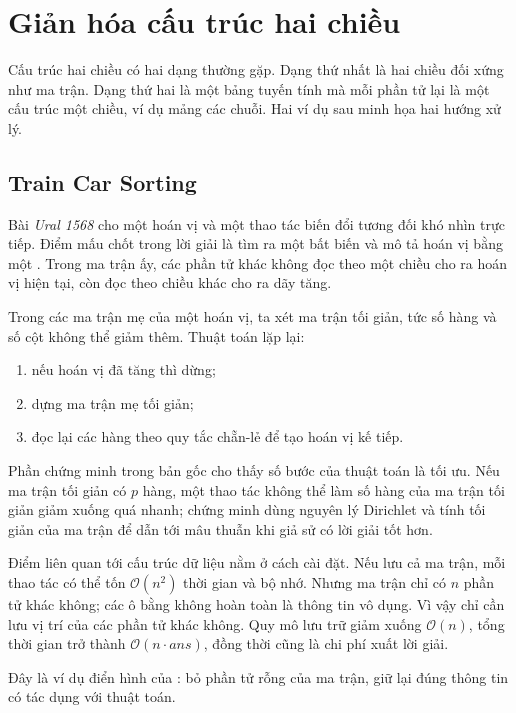 \documentclass[11pt]{article}
\newcommand{\Oh}{\mathcal{O}}
\begin{document}
\section{Giản hóa cấu trúc hai chiều}

Cấu trúc hai chiều có hai dạng thường gặp. Dạng thứ nhất là hai chiều đối xứng
như ma trận. Dạng thứ hai là một bảng tuyến tính mà mỗi phần tử lại là một cấu
trúc một chiều, ví dụ mảng các chuỗi. Hai ví dụ sau minh họa hai hướng xử lý.

\subsection{Train Car Sorting}

Bài \textit{Ural 1568} cho một hoán vị và một thao tác biến đổi tương đối khó
nhìn trực tiếp. Điểm mấu chốt trong lời giải là tìm ra một bất biến và mô
tả hoán vị bằng một . Trong ma trận ấy, các phần tử khác
không đọc theo một chiều cho ra hoán vị hiện tại, còn đọc theo chiều khác cho
ra dãy tăng.

Trong các ma trận mẹ của một hoán vị, ta xét ma trận tối giản, tức số hàng và
số cột không thể giảm thêm. Thuật toán lặp lại:
\begin{enumerate}
  \item nếu hoán vị đã tăng thì dừng;
  \item dựng ma trận mẹ tối giản;
  \item đọc lại các hàng theo quy tắc chẵn-lẻ để tạo hoán vị kế tiếp.
\end{enumerate}

Phần chứng minh trong bản gốc cho thấy số bước của thuật toán là tối ưu. Nếu
ma trận tối giản có \(p\) hàng, một thao tác không thể làm số hàng của ma trận
tối giản giảm xuống quá nhanh; chứng minh dùng nguyên lý Dirichlet và tính tối
giản của ma trận để dẫn tới mâu thuẫn khi giả sử có lời giải tốt hơn.

Điểm liên quan tới cấu trúc dữ liệu nằm ở cách cài đặt. Nếu lưu cả ma trận,
mỗi thao tác có thể tốn \(\Oh(n^2)\) thời gian và bộ nhớ. Nhưng ma trận chỉ có
\(n\) phần tử khác không; các ô bằng không hoàn toàn là thông tin vô dụng. Vì
vậy chỉ cần lưu vị trí của các phần tử khác không. Quy mô lưu trữ giảm xuống
\(\Oh(n)\), tổng thời gian trở thành \(\Oh(n\cdot ans)\), đồng thời cũng là
chi phí xuất lời giải.

Đây là ví dụ điển hình của : bỏ phần tử rỗng của ma trận,
giữ lại đúng thông tin có tác dụng với thuật toán.
\end{document}
